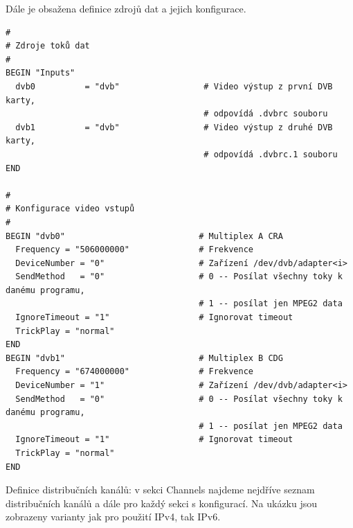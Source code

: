 Dále je obsažena definice zdrojů dat a jejich konfigurace.

\begin{small}
\begin{verbatim}
#
# Zdroje toků dat
#
BEGIN "Inputs"
  dvb0          = "dvb"                 # Video výstup z první DVB karty, 
                                        # odpovídá .dvbrc souboru
  dvb1          = "dvb"                 # Video výstup z druhé DVB karty, 
                                        # odpovídá .dvbrc.1 souboru
END

#
# Konfigurace video vstupů
#
BEGIN "dvb0"                           # Multiplex A CRA
  Frequency = "506000000"              # Frekvence
  DeviceNumber = "0"                   # Zařízení /dev/dvb/adapter<i>
  SendMethod   = "0"                   # 0 -- Posílat všechny toky k danému programu, 
                                       # 1 -- posílat jen MPEG2 data
  IgnoreTimeout = "1"                  # Ignorovat timeout
  TrickPlay = "normal"                 
END
BEGIN "dvb1"                           # Multiplex B CDG
  Frequency = "674000000"              # Frekvence
  DeviceNumber = "1"                   # Zařízení /dev/dvb/adapter<i>
  SendMethod   = "0"                   # 0 -- Posílat všechny toky k danému programu, 
                                       # 1 -- posílat jen MPEG2 data
  IgnoreTimeout = "1"                  # Ignorovat timeout
  TrickPlay = "normal"
END
\end{verbatim}
\end{small}

Definice distribučních kanálů: v sekci Channels najdeme nejdříve seznam distribučních kanálů a dále pro každý sekci s konfigurací. Na ukázku jsou zobrazeny varianty jak pro použití IPv4, tak IPv6.

